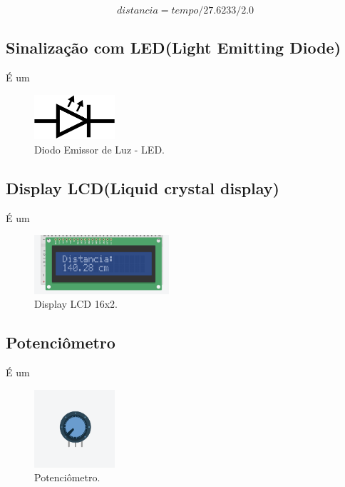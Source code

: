 \documentclass[conference]{IEEEtran}
\begin{document}
\begin{equation}
    distancia = tempo / 27.6233 / 2.0 \label{eq}
\end{equation}

\subsection{Sinalização com LED(Light Emitting Diode)}
É um \cite{marteleto2011}

\begin{figure}[htbp]
    \centerline{
        \includegraphics[width=3cm]{images/led-simbolo.png}
    }
    \caption{Diodo Emissor de Luz - LED.}
    \label{fig}
\end{figure}

\subsection{Display LCD(Liquid crystal display)}
É um \cite{barbacena1996display}

\begin{figure}[htbp]
    \centerline{
        \includegraphics[width=5cm]{images/display.png}
    }
    \caption{Display LCD 16x2.}
    \label{fig}
\end{figure}

\subsection{Potenciômetro}
É um \cite{patsko2006}

\begin{figure}[htbp]
    \centerline{
        \includegraphics[width=3cm]{images/potenciometro.png}
    }
    \caption{Potenciômetro.}
    \label{fig}
\end{figure}
\end{document}
